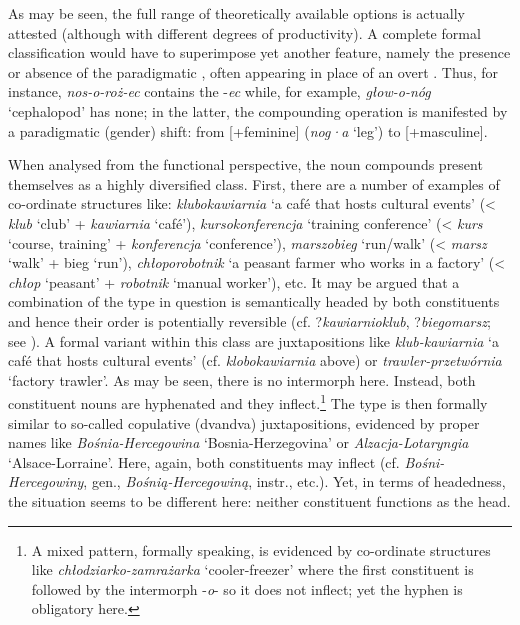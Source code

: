 \documentclass[output=paper]{LSP/langsci}
\begin{document}
{As may be seen, the full range of theoretically available options is actually attested (although with different degrees of productivity). A complete formal classification would have to superimpose yet another feature, namely the presence or absence of the paradigmatic , often appearing in place of an overt . Thus, for instance,} {\textit{nos-o-roż-ec}} {contains the  -}{\textit{ec}} {while, for example,} {\textit{głow-o-nóg}} {‘cephalopod’ has none; in the latter, the compounding operation is manifested by a paradigmatic (gender) shift: from [+feminine] (}{\textit{nog}}{\textit·}{\textit{a}} {‘leg’) to [+masculine].}

{When analysed from the functional perspective, the  noun compounds present themselves as a highly diversified class. First, there are a number of examples of co-ordinate structures like:} {\textit{klubokawiarnia}} {‘a café that hosts cultural events’ (<} {\textit{klub}} {‘club’ +} {\textit{kawiarnia}} {‘café’),} {\textit{kursokonferencja}} {‘training conference’ (<} {\textit{kurs}} {‘course, training’ +} {\textit{konferencja}} {‘conference’),} {\textit{marszobieg}} {‘run/walk’ (<} {\textit{marsz}} {‘walk’ + bieg ‘run’),} {\textit{chłoporobotnik}} {‘a peasant farmer who works in a factory’ (<} {\textit{chłop}} {‘peasant’ +} {\textit{robotnik}} {‘manual worker’), etc. It may be argued that a combination of the type in question is semantically headed by both constituents and hence their order is potentially reversible (cf. ?}{\textit{kawiarnioklub}}{, ?}{\textit{biegomarsz}}{; see \citealt[59]{Kurzowa1976}). A formal variant within this class are juxtapositions like} {\textit{klub-kawiarnia}} {‘a café that hosts cultural events’ (cf.} {\textit{klobokawiarnia}} {above) or} {\textit{trawler-przetwórnia}} {‘factory trawler’. As may be seen, there is no intermorph here. Instead, both constituent nouns are hyphenated and they inflect.}\footnote{{A mixed pattern, formally speaking, is evidenced by co-ordinate structures like} {\textit{chłodziarko-zamrażarka}} {‘cooler-freezer’ where the first constituent is followed by the intermorph -}{\textit{o}}{- so it does not inflect; yet the hyphen is obligatory here.}} {The type is then formally similar to so-called copulative (dvandva) juxtapositions, evidenced by proper names like} {\textit{Bośnia-Hercegowina}} {‘Bosnia-Herzegovina’ or} {\textit{Alzacja-Lotaryngia}} {‘Alsace-Lorraine’. Here, again, both constituents may inflect (cf.} {\textit{Bośni-Hercegowiny}}{, gen.,} {\textit{Bośnią-Hercegowiną}}{, instr., etc.). Yet, in terms of headedness, the situation seems to be different here: neither constituent functions as the head.}
\end{document}
